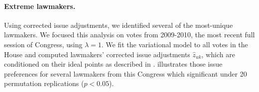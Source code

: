 

\paragraph{Extreme lawmakers.}

Using corrected issue adjustments, we identified several of the
most-unique lawmakers.  We focused this analysis on votes from
2009-2010, the most recent full session of Congress, using
$\lambda=1$.  We fit the variational model to all votes in the House
and computed lawmakers' corrected issue adjustments $\hat z_{uk}$, which are
conditioned on their ideal points as described in
.
 illustrates those issue
preferences for several lawmakers from this Congress which significant
under 20 permutation replications ($p < 0.05$).

